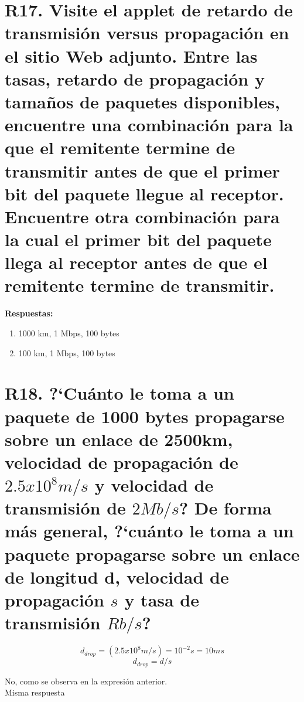 \documentclass[a4paper, 11pt]{article}
\theoremstyle{definition} \theoremstyle{remark}
\begin{document}
     \section{R17. Visite el applet de retardo de transmisi\'on versus propagaci\'on en el sitio Web adjunto. Entre las tasas, retardo de propagaci\'on y tama\~{n}os de paquetes disponibles, encuentre una combinaci\'on para la que el remitente termine de transmitir antes de que el primer bit del paquete llegue al receptor. Encuentre otra combinaci\'on para la cual el primer bit del paquete llega al receptor antes de que el remitente termine de transmitir. }
     \textbf{Respuestas:}
     \begin{enumerate}
       \item 1000 km, 1 Mbps, 100 bytes
       \item 100 km, 1 Mbps, 100 bytes
     \end{enumerate}

     \section{R18. ?`Cu\'anto le toma a un paquete de 1000 bytes propagarse sobre un enlace de 2500km, velocidad de propagaci\'on de $2.5x10^8m/s$ y velocidad de transmisi\'on de $2 Mb/s$? De forma m\'as general, ?`cu\'anto le toma a un paquete propagarse sobre un enlace de longitud d, velocidad de propagaci\'on $s$ y tasa de transmisi\'on $Rb/s$?}
     \begin{equation}\label{A2}
        d_{drop} = (2.5x10^8 m/s) = 10^{-2} s = 10ms
     \end{equation}
     \begin{equation}\label{A3}
        d_{drop} = d/s
     \end{equation}
     \begin{center}
       No, como se observa en la expresi\'on anterior.\\
       Misma respuesta
     \end{center}
\end{document}
